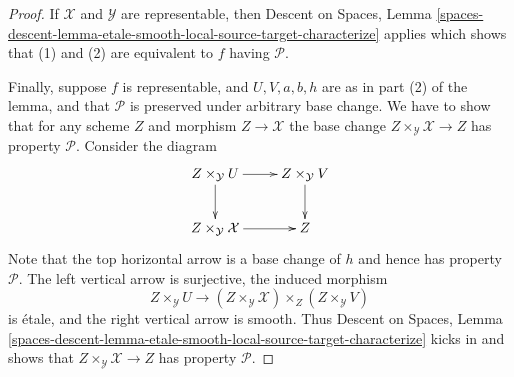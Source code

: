 \documentclass[10pt,a4paper]{amsart}
\theoremstyle{plain}
\theoremstyle{definition}
\theoremstyle{remark}
\numberwithin{equation}{subsection}
\begin{document}
\begin{proof}
\medskip\noindent
If $\mathcal{X}$ and $\mathcal{Y}$ are representable, then
Descent on Spaces,
Lemma \ref{spaces-descent-lemma-etale-smooth-local-source-target-characterize}
applies which shows that (1) and (2) are equivalent to $f$ having
$\mathcal{P}$.

\medskip\noindent
Finally, suppose $f$ is representable, and $U, V, a, b, h$ are
as in part (2) of the lemma, and that $\mathcal{P}$ is preserved under
arbitrary base change. We have to show that for any scheme
$Z$ and morphism $Z \to \mathcal{X}$ the base change
$Z \times_\mathcal{Y} \mathcal{X} \to Z$
has property $\mathcal{P}$. Consider the diagram
$$
\xymatrix{
Z \times_\mathcal{Y} U \ar[d] \ar[r] &
Z \times_\mathcal{Y} V \ar[d] \\
Z \times_\mathcal{Y} \mathcal{X} \ar[r] &
Z
}
$$
Note that the top horizontal arrow is a base change of $h$ and
hence has property $\mathcal{P}$. The left vertical arrow is
surjective, the induced morphism
$$
Z \times_\mathcal{Y} U \longrightarrow
(Z \times_\mathcal{Y} \mathcal{X}) \times_Z (Z \times_\mathcal{Y} V)
$$
is \'etale, and the right vertical arrow is smooth. Thus
Descent on Spaces,
Lemma \ref{spaces-descent-lemma-etale-smooth-local-source-target-characterize}
kicks in and shows that $Z \times_\mathcal{Y} \mathcal{X} \to Z$
has property $\mathcal{P}$.
\end{proof}
\end{document}
